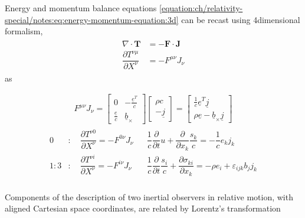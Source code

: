 \documentclass[letterpaper,10pt,english]{jupyterBook}
\begin{document}
\sphinxAtStartPar
Energy and momentum balance equations \eqref{equation:ch/relativity-special/notes:eq:energy-momentum-equation:3d} can be recast using 4\sphinxhyphen{}dimensional formalism,
\begin{equation*}
\begin{split}\begin{aligned}
  \nabla \cdot \mathbf{T} & = - \mathbf{F} \cdot \mathbf{J}  \\
  \dfrac{\partial T^{\nu \mu} }{\partial X^{\nu}} & = - F^{\mu \nu} J_{\nu}
\end{aligned}\end{split}
\end{equation*}
\sphinxAtStartPar
as




\begin{equation*}
\begin{split}F^{\mu \nu} J_{\nu} = \begin{bmatrix} 0 &  -\frac{\underline{e}^T}{c} \\ \frac{\underline{e}}{c} & \underline{b}_{\times} \end{bmatrix} \begin{bmatrix} \rho c \\ - \underline{j} \end{bmatrix} = \begin{bmatrix} \frac{1}{c} \underline{e}^T \underline{j} \\ \rho \underline{e} - \underline{b}_\times \underline{j} \end{bmatrix}\end{split}
\end{equation*}\begin{equation*}
\begin{split}\begin{aligned}
  0   & : \quad \dfrac{\partial T^{\nu 0}}{\partial X^{\nu}} = - F^{0 \nu} J_{\nu} && \dfrac{1}{c}\dfrac{\partial}{\partial t} u + \dfrac{\partial}{\partial x_k} \dfrac{s_k}{c} = - \dfrac{1}{c} e_k j_k \\
  1:3 & : \quad \dfrac{\partial T^{\nu i}}{\partial X^{\nu}} = - F^{i \nu} J_{\nu} && \dfrac{1}{c}\dfrac{\partial}{\partial t} \dfrac{s_i}{c} + \dfrac{\partial \sigma_{ki}}{\partial x_k} = - \rho e_i + \varepsilon_{ijk} b_j j_k  \\
\end{aligned}\end{split}
\end{equation*}


\sphinxAtStartPar
{} Components of the description of two inertial observers in relative motion, with aligned Cartesian space coordinates, are related by Lorentz’s transformation
\end{document}
